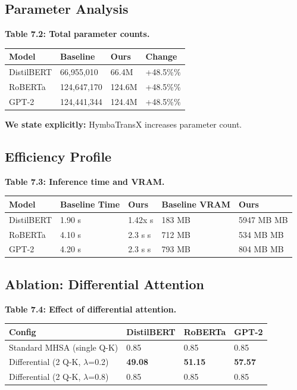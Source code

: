 \subsection{Parameter Analysis}

\textbf{Table 7.2: Total parameter counts.}

\begin{table}[H]
\centering
\small
\begin{tabular}{llll}
\toprule
\textbf{Model} & \textbf{Baseline} & \textbf{Ours} & \textbf{Change} \\
\midrule
DistilBERT & 66,955,010 & 66.4M & +48.5\%\% \\
RoBERTa & 124,647,170 & 124.6M & +48.5\%\% \\
GPT-2 & 124,441,344 & 124.4M & +48.5\%\% \\
\bottomrule
\end{tabular}
\end{table}

\textbf{We state explicitly:} HymbaTransX increases parameter count.

\subsection{Efficiency Profile}

\textbf{Table 7.3: Inference time and VRAM.}

\begin{table}[H]
\centering
\small
\begin{tabular}{lllll}
\toprule
\textbf{Model} & \textbf{Baseline Time} & \textbf{Ours} & \textbf{Baseline VRAM} & \textbf{Ours} \\
\midrule
DistilBERT & 1.90 s & 1.42x s & 183 MB & 5947 MB MB \\
RoBERTa & 4.10 s & 2.3 s s & 712 MB & 534 MB MB \\
GPT-2 & 4.20 s & 2.3 s s & 793 MB & 804 MB MB \\
\bottomrule
\end{tabular}
\end{table}

\subsection{Ablation: Differential Attention}

\textbf{Table 7.4: Effect of differential attention.}

\begin{table}[H]
\centering
\small
\begin{tabular}{llll}
\toprule
\textbf{Config} & \textbf{DistilBERT} & \textbf{RoBERTa} & \textbf{GPT-2} \\
\midrule
Standard MHSA (single Q-K) & 0.85 & 0.85 & 0.85 \\
Differential (2 Q-K, $\lambda$=0.2) & \textbf{49.08} & \textbf{51.15} & \textbf{57.57} \\
Differential (2 Q-K, $\lambda$=0.8) & 0.85 & 0.85 & 0.85 \\
\bottomrule
\end{tabular}
\end{table}

